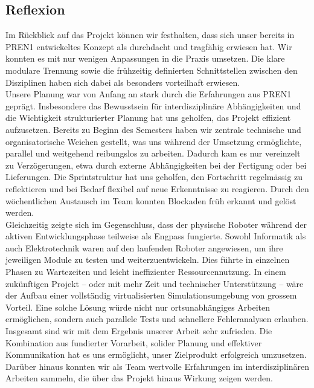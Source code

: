 \documentclass[main.tex]{subfiles} %
\begin{document}

\subsection{Reflexion}

Im Rückblick auf das Projekt können wir festhalten, dass sich unser bereits in PREN1
entwickeltes Konzept als durchdacht und tragfähig erwiesen hat. Wir konnten es mit nur
wenigen Anpassungen in die Praxis umsetzen. Die klare modulare Trennung sowie die frühzeitig definierten Schnittstellen
zwischen den Disziplinen haben sich dabei als besonders vorteilhaft erwiesen.\\

Unsere Planung war von Anfang an stark durch die Erfahrungen aus PREN1 geprägt.
Insbesondere das Bewusstsein für interdisziplinäre Abhängigkeiten und die Wichtigkeit
strukturierter Planung hat uns geholfen, das Projekt effizient aufzusetzen. Bereits zu
Beginn des Semesters haben wir zentrale technische und organisatorische Weichen gestellt,
was uns während der Umsetzung ermöglichte, parallel und weitgehend reibungslos zu
arbeiten. Dadurch kam es nur vereinzelt zu Verzögerungen, etwa durch externe
Abhängigkeiten bei der Fertigung oder bei Lieferungen. Die Sprintstruktur hat uns 
geholfen, den Fortschritt regelmässig zu reflektieren und bei Bedarf flexibel auf 
neue Erkenntnisse zu reagieren. Durch den wöchentlichen Austausch im
Team konnten Blockaden früh erkannt und gelöst werden. \\

Gleichzeitig zeigte sich im Gegenschluss, dass der physische Roboter während der aktiven
Entwicklungsphase teilweise als Engpass fungierte. Sowohl Informatik als auch
Elektrotechnik waren auf den laufenden Roboter angewiesen, um ihre jeweiligen Module zu
testen und weiterzuentwickeln. Dies führte in einzelnen Phasen zu Wartezeiten und leicht
ineffizienter Ressourcennutzung. In einem zukünftigen Projekt – oder mit mehr Zeit und
technischer Unterstützung – wäre der Aufbau einer vollständig virtualisierten
Simulationsumgebung von grossem Vorteil. Eine solche Lösung würde nicht nur
ortsunabhängiges Arbeiten ermöglichen, sondern auch parallele Tests und schnellere
Fehleranalysen erlauben.\\

Insgesamt sind wir mit dem Ergebnis unserer Arbeit sehr zufrieden. Die Kombination aus
fundierter Vorarbeit, solider Planung und effektiver Kommunikation hat es uns ermöglicht,
unser Zielprodukt erfolgreich umzusetzen. Darüber hinaus konnten wir als Team wertvolle 
Erfahrungen im interdisziplinären Arbeiten sammeln, die über das Projekt hinaus Wirkung 
zeigen werden.
\end{document}
